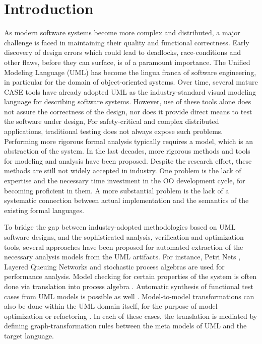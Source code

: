 \documentclass[letter]{llncs}
\newcommand{\secshrinkbegin}{\vspace{-.2cm}}
\begin{document}
\section{Introduction}
\label{sec:Introduction}
\secshrinkbegin
\vspace{-5 pt}
As modern software systems become more complex and distributed, a major
challenge is faced 
in maintaining their quality and functional correctness. Early discovery of
design errors which could
lead to deadlocks, race-conditions and other flaws, before they can surface,
is of a paramount importance.
The Unified Modeling Language (UML) \cite{UML2.4} has become the lingua franca
of software engineering, in particular for the domain of object-oriented
systems. Over time, several mature CASE tools have already adopted UML as the
industry-standard visual modeling language for describing software systems. 
However, use of these tools alone does not
assure the correctness of the design, nor does it provide direct means to test
the software under design,
For safety-critical and
complex distributed applications, traditional testing does not always expose
such problems. Performing more rigorous formal
analysis typically requires a model, which is an abstraction of the system.
In the last decades, more rigorous methods and tools for modeling and analysis
 have been proposed. Despite the research effort,
these methods are still not widely
accepted in industry. One problem is the lack of expertise and the necessary
time investment in the OO development cycle, for becoming proficient in them. 
A more substantial problem is the lack of a systematic connection between 
actual implementation and the semantics of the existing formal languages. 
\vspace{-1 pt}

To bridge the gap between industry-adopted methodologies based on UML
software designs, and the sophisticated analysis, verification and optimization tools, several approaches have been proposed for
automated extraction of the necessary analysis models from the UML artifacts. For instance, Petri
Nets \cite{DBLP:journals/tse/DistefanoSP11,Bernardi:2002:USD:584369.584376}, Layered 
Queuing Networks \cite{Petriu:2002:AUP:647810.737982}
and stochastic process algebras
\cite{Tribastone:2008:AEP:1383559.1383569,Tribastone:2008:ATU:1446304.1447447} are used for performance
analysis. Model checking for certain properties of the system is often done via
translation into process algebra
\cite{10.1109/APSEC.2005.7,inpJuDuJuLaPo06a}. Automatic synthesis of functional
test cases from UML models is possible as well
\cite{Bandyopadhyay:2009:TIG:1547558.1548197,Pickin02systemtest,Dinh-Trong:2006:SAG:1190616.1191226}. 
Model-to-model transformations
can also be done within the UML domain itself, for the purpose of model optimization or
refactoring \cite{Whittle:2002:TSM:647246.719610}.
In each of these cases, the translation is mediated by defining
graph-transformation rules between the meta models of UML and the target language.
\end{document}
